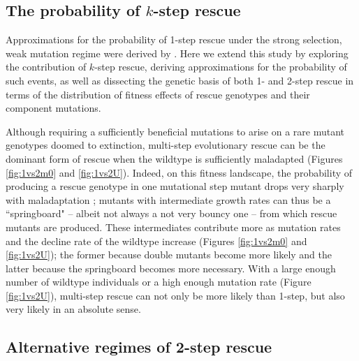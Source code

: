 \documentclass[9pt,twocolumn,twoside,lineno]{gsajnl}
\begin{document}
\subsection{The probability of $k$-step rescue}

Approximations for the probability of 1-step rescue under the strong selection, weak mutation regime were derived by \cite{Anciaux2018}.  
Here we extend this study by exploring the contribution of $k$-step rescue, deriving approximations for the probability of such events, as well as dissecting the genetic basis of both 1- and 2-step rescue in terms of the distribution of fitness effects of rescue genotypes and their component mutations.

Although requiring a sufficiently beneficial mutations to arise on a rare mutant genotypes doomed to extinction, multi-step evolutionary rescue can be the dominant form of rescue when the wildtype is sufficiently maladapted (Figures \ref{fig:1vs2m0} and \ref{fig:1vs2U}). 
Indeed, on this fitness landscape, the probability of producing a rescue genotype in one mutational step mutant drops very sharply with maladaptation \citep{Anciaux2018}; mutants with intermediate growth rates can thus be a ``springboard" -- albeit not always a not very bouncy one -- from which rescue mutants are produced. 
These intermediates contribute more as mutation rates and the decline rate of the wildtype increase (Figures \ref{fig:1vs2m0} and \ref{fig:1vs2U}); the former because double mutants become more likely and the latter because the springboard becomes more necessary.
With a large enough number of wildtype individuals or a high enough mutation rate (Figure \ref{fig:1vs2U}), multi-step rescue can not only be more likely than 1-step, but also very likely in an absolute sense.

\subsection{Alternative regimes of 2-step rescue}
\end{document}
